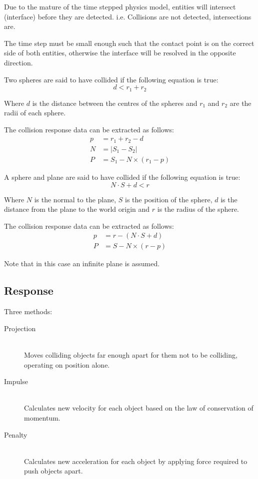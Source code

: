 \documentclass[a4paper]{article}
\begin{document}
Due to the mature of the time stepped physics model, entities will intersect
(interface) before they are detected. i.e. Collisions are not detected,
intersections are.

The time step must be small enough such that the contact point is on the correct
side of both entities, otherwise the interface will be resolved in the opposite
direction.


Two spheres are said to have collided if the following equation is true:
\[
  d < r_{1} + r_{2}
\]

Where $d$ is the distance between the centres of the spheres and $r_{1}$ and
$r_{2}$ are the radii of each sphere.

The collision response data can be extracted as follows:
\begin{align*}
  p &= r_{1} + r_{2} - d \\
  N &= |S_{1} - S_{2}| \\
  P &= S_{1} - N \times (r_{1} - p)
\end{align*}


A sphere and plane are said to have collided if the following equation is true:
\[
  N \cdot S + d < r
\]

Where $N$ is the normal to the plane, $S$ is the position of the sphere, $d$ is
the distance from the plane to the world origin and $r$ is the radius of the
sphere.

The collision response data can be extracted as follows:
\begin{align*}
  p &= r - (N \cdot S + d) \\
  P &= S - N \times (r - p)
\end{align*}

Note that in this case an infinite plane is assumed.

\subsection{Response}

Three methods:
\begin{description}
  \item[Projection] \hfill \\
    Moves colliding objects far enough apart for them not to be colliding,
    operating on position alone.
  \item[Impulse] \hfill \\
    Calculates new velocity for each object based on the law of conservation of
    momentum.
  \item[Penalty] \hfill \\
    Calculates new acceleration for each object by applying force required to
    push objects apart.
\end{description}
\end{document}
